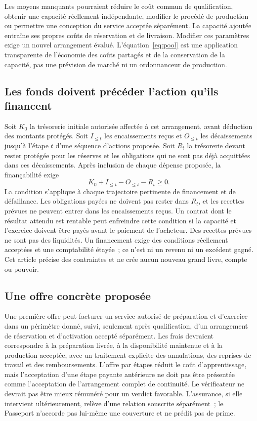 \documentclass[11pt,a4paper]{article}
\begin{document}
Les moyens manquants pourraient réduire le coût commun de qualification, obtenir une capacité réellement indépendante, modifier le procédé de production ou permettre une conception du service acceptée séparément. La capacité ajoutée entraîne ses propres coûts de réservation et de livraison. Modifier ces paramètres exige un nouvel arrangement évalué. L’équation~\eqref{eq:pool} est une application transparente de l’économie des coûts partagés et de la conservation de la capacité, pas une prévision de marché ni un ordonnanceur de production.

\subsection{Les fonds doivent précéder l’action qu’ils financent}
Soit $K_0$ la trésorerie initiale autorisée affectée à cet arrangement, avant déduction des montants protégés. Soit $I_{\leq t}$ les encaissements reçus et $O_{\leq t}$ les décaissements jusqu’à l’étape $t$ d’une séquence d’actions proposée. Soit $R_t$ la trésorerie devant rester protégée pour les réserves et les obligations qui ne sont pas déjà acquittées dans ces décaissements. Après inclusion de chaque dépense proposée, la finançabilité exige
\begin{equation}
K_0+I_{\leq t}-O_{\leq t}-R_t\geq 0.
\end{equation}
La condition s’applique à chaque trajectoire pertinente de financement et de défaillance. Les obligations payées ne doivent pas rester dans $R_t$, et les recettes prévues ne peuvent entrer dans les encaissements reçus. Un contrat dont le résultat attendu est rentable peut enfreindre cette condition si la capacité et l’exercice doivent être payés avant le paiement de l’acheteur. Des recettes prévues ne sont pas des liquidités. Un financement exige des conditions réellement acceptées et une comptabilité étayée~; ce n’est ni un revenu ni un excédent gagné. Cet article précise des contraintes et ne crée aucun nouveau grand livre, compte ou pouvoir.

\subsection{Une offre concrète proposée}
Une première offre peut facturer un service autorisé de préparation et d’exercice dans un périmètre donné, suivi, seulement après qualification, d’un arrangement de réservation et d’activation accepté séparément. Les frais devraient correspondre à la préparation livrée, à la disponibilité maintenue et à la production acceptée, avec un traitement explicite des annulations, des reprises de travail et des remboursements. L’offre par étapes réduit le coût d’apprentissage, mais l’acceptation d’une étape payante antérieure ne doit pas être présentée comme l’acceptation de l’arrangement complet de continuité. Le vérificateur ne devrait pas être mieux rémunéré pour un verdict favorable. L’assurance, si elle intervient ultérieurement, relève d’une relation souscrite séparément~; le Passeport n’accorde pas lui-même une couverture et ne prédit pas de prime.
\end{document}
